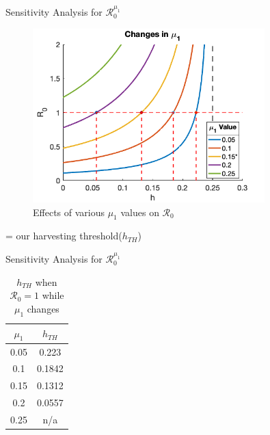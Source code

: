 \documentclass{beamer}
\begin{document}
\begin{frame}{Sensitivity Analysis for $\mathscr{R}_{0}^{\mu_1}$}
    \begin{figure}
        \centering
        \includegraphics[width=0.8\textwidth]{Latex/Figures/Graphs/mu1_sens_analysis.png}
        \caption{Effects of various $\mu_{1}$ values on $\mathscr{R}_{0}$}
        \label{fig:mu1_sens_analysis}
    \end{figure}
    \vspace{-0.6cm}
    \begin{center}
        \scriptsize * = our harvesting threshold($h_{TH}$)
    \end{center}
\end{frame}

\begin{frame}{Sensitivity Analysis for $\mathscr{R}_{0}^{\mu_1}$}
    \begin{table}[H]
        \centering
        \begin{tabular}{c|c}
             $\mu_{1}$ & $h_{TH}$ \\
             \hline
             0.05 & 0.223\\
             0.1 & 0.1842\\
             0.15 & 0.1312\\
             0.2 & 0.0557\\
             0.25 & n/a\\
        \end{tabular}
        \caption{$h_{TH}$ when $\mathscr{R}_{0}=1$ while $\mu_{1}$ changes}
        \label{tab:mu1_sens_analysis_values}
    \end{table}
\end{frame}
\end{document}
